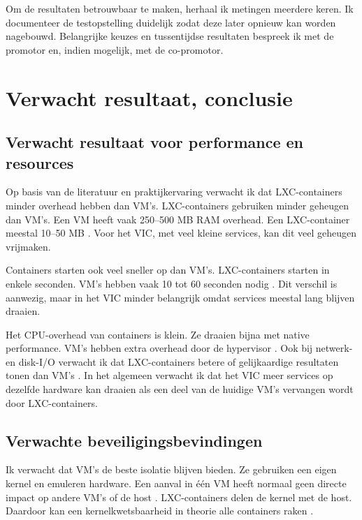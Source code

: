 Om de resultaten betrouwbaar te maken, herhaal ik metingen meerdere keren. Ik documenteer de testopstelling duidelijk zodat deze later opnieuw kan worden nagebouwd. Belangrijke keuzes en tussentijdse resultaten bespreek ik met de promotor en, indien mogelijk, met de co-promotor.



\section{Verwacht resultaat, conclusie}%
\label{sec:verwachte_resultaten}

\subsection{Verwacht resultaat voor performance en resources}

Op basis van de literatuur en praktijkervaring verwacht ik dat LXC-containers minder overhead hebben dan VM's. LXC-containers gebruiken minder geheugen dan VM's. Een VM heeft vaak 250--500 MB RAM overhead. Een LXC-container meestal 10--50 MB \autocite{LogicWeb2025}. Voor het VIC, met veel kleine services, kan dit veel geheugen vrijmaken.

Containers starten ook veel sneller op dan VM's. LXC-containers starten in enkele seconden. VM's hebben vaak 10 tot 60 seconden nodig \autocite{LogicWeb2025}. Dit verschil is aanwezig, maar in het VIC minder belangrijk omdat services meestal lang blijven draaien.

Het CPU-overhead van containers is klein. Ze draaien bijna met native performance. VM's hebben extra overhead door de hypervisor \autocite{LogicWeb2025, ArXiv2023Convergence}. Ook bij netwerk- en disk-I/O verwacht ik dat LXC-containers betere of gelijkaardige resultaten tonen dan VM's \autocite{LogicWeb2025}. In het algemeen verwacht ik dat het VIC meer services op dezelfde hardware kan draaien als een deel van de huidige VM's vervangen wordt door LXC-containers.

\subsection{Verwachte beveiligingsbevindingen}

Ik verwacht dat VM's de beste isolatie blijven bieden. Ze gebruiken een eigen kernel en emuleren hardware. Een aanval in één VM heeft normaal geen directe impact op andere VM's of de host \autocite{ArXiv2021Isolation}. LXC-containers delen de kernel met de host. Daardoor kan een kernelkwetsbaarheid in theorie alle containers raken \autocite{Aquasec2024}.

